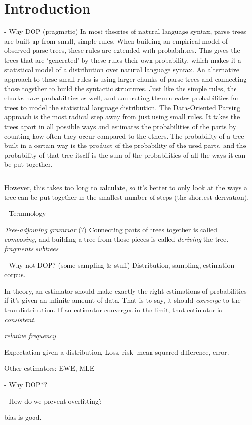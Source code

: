 
\section{Introduction}


- Why DOP (pragmatic)
In most theories of natural language syntax, parse trees are built up from small, simple rules. When building an empirical model of observed parse trees, these rules are extended with probabilities. This gives the trees that are `generated' by these rules their own probability, which makes it a statistical model of a distribution over natural language syntax.
An alternative approach to these small rules is using larger chunks of parse trees and connecting those together to build the syntactic structures. Just like the simple rules, the chucks have probabilities as well, and connecting them creates probabilities for trees to model the statistical language distribution.
The Data-Oriented Parsing approach is the most radical step away from just using small rules. It takes the trees apart in all possible ways and estimates the probabilities of the parts by counting how often they occur compared to the others. The probability of a tree built in a certain way is the product of the probability of the used parts, and the probability of that tree itself is the sum of the probabilities of all the ways it can be put together.

$$$$

However, this takes too long to calculate, so it's better to only look at the ways a tree can be put together in the smallest number of steps (the shortest derivation).

- Terminology

\emph{Tree-adjoining grammar} (?)
Connecting parts of trees together is called \emph{composing}, and building a tree from those pieces is called \emph{deriving} the tree.
\emph{fragments}
\emph{subtrees}

- Why not DOP? (some sampling & stuff)
Distribution, sampling, estimation, corpus.

In theory, an estimator should make exactly the right estimations of probabilities if it's given an infinite amount of data. That is to say, it should \emph{converge} to the true distribution. If an estimator converges in the limit, that estimator is \emph{consistent}.

\emph{relative frequency}

Expectation given a distribution, Loss, risk, mean squared difference, error.

Other estimators:
EWE, MLE



- Why DOP*?



- How do we prevent overfitting?

bias is good.